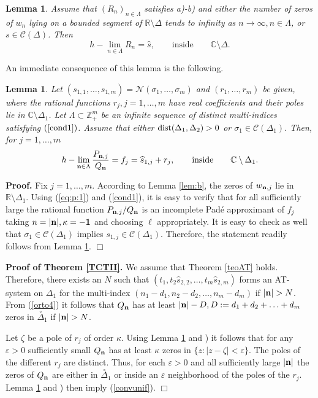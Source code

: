\documentclass[10pt,a4paper]{article}
\newtheorem{lemma}[theorem]{Lemma}
\theoremstyle{definition}
\theoremstyle{remark}
\numberwithin{equation}{section}
\begin{document}
\begin{lemma} \label{BusLop}
Assume that $(R_n)_{n \in \Lambda}$ satisfies {\rm a)-b)} and either the number of zeros of $w_n$ lying on a bounded segment of $\mathbb{R} \setminus \Delta$ tends to infinity as $n\to\infty, n \in \Lambda$, or $s \in \mathcal{C}(\Delta)$.
Then
\[ h-\lim_{n \in \Lambda} R_n = \widehat{s},\qquad \mbox{inside}\qquad  \mathbb{C} \setminus \Delta.
\]
\end{lemma}
\medskip

An immediate consequence of this lemma is the following.

\begin{lemma} \label{convHaus2} Let $ (s_{1,1},\ldots,s_{1,m}) = \mathcal{N}(\sigma_1,\ldots,\sigma_m)$ and $  (r_1,\ldots,r_m)$ be given,  where the rational functions $r_j, j=1,\ldots,m$ have real coefficients and  their poles  lie in  ${\mathbb{C}}\setminus \Delta_1$. Let $\Lambda \subset \mathbb{Z}_+^{m}$ be an infinite sequence of distinct multi-indices  satisfying $(\ref{cond1})$.
Assume that either $\mbox{\rm dist}(\Delta_{1},\Delta_2) >0$  or $\sigma_1\in \mathcal{C}(\Delta_1)$. Then, for $j=1,\ldots,m$
\[ h-\lim_{{\bf n}\in \Lambda}
\frac{P_{{\bf n},j}}{Q_{{\bf n}}} = f_j = \widehat{s}_{1,j} + r_j, \qquad \mbox{inside} \qquad \mathbb{C}\setminus \Delta_{1}.
\]
\end{lemma}

{\bf Proof.} Fix $j =1,\ldots,m$. According to Lemma \ref{lem:b}, the zeros of $w_{{\bf n},j}$ lie in $\mathbb{R} \setminus \Delta_1$. Using (\ref{eq:p:1}) and (\ref{cond1}), it is easy to verify that  for all sufficiently large the rational function $P_{{\bf n},j}/Q_{\bf n}$ is an incomplete Pad\'e approximant of $f_j$ taking $n = |\bf n|, \kappa = -1$ and choosing $\ell$ appropriately. It is easy to check as well that  $\sigma_1 \in \mathcal{C}(\Delta_1)$ implies $s_{1,j} \in \mathcal{C}(\Delta_1)$. Therefore, the statement readily follows from Lemma \ref{BusLop}. \hfill $\Box$
\medskip


{\bf Proof of Theorem \ref{TCTII}.}
We assume that Theorem \ref{teoAT} holds. Therefore, there exists an $N$ such that $(t_{1},t_{2}\hat{s}_{2,2},\ldots,t_{m}\hat{s}_{2,m})$ forms an AT-system on $\Delta_{1}$ for the multi-index $(n_{1}-d_{1},n_{2}-d_{2},\ldots,n_m-d_m)$ if $ \left|{\bf n}\right|>N$. From (\ref{orto4}) it follows that
$Q_{{\bf n}}$ has at least  $|{\bf n}|- D, D := d_{1}+d_{2}+\ldots+d_m$ zeros in $\stackrel{\circ}{\Delta}_{1}$  if $ \left|{\bf n}\right|>N$.

Let $\zeta$ be a pole of $r_j$ of order $\kappa$. Using Lemma \ref{convHaus2} and \cite[Lemma 1]{Gon}) it follows that for any $\varepsilon > 0$ sufficiently small $Q_{\bf n}$ has at least $\kappa$ zeros in $\{z: |z-\zeta| < \varepsilon\}$. The poles of the different $r_j$ are distinct. Thus, for each $\varepsilon > 0$ and all sufficiently large $|{\bf n}|$ the zeros of $Q_{\bf n}$ are either in $\stackrel{\circ}{\Delta}_{1}$ or inside an $\varepsilon$ neighborhood of the poles of the $r_j$. Lemma \ref{convHaus2} and \cite[Lemma 1]{Gon}) then imply (\ref{convunif}).  \hfill $\Box$
\end{document}
